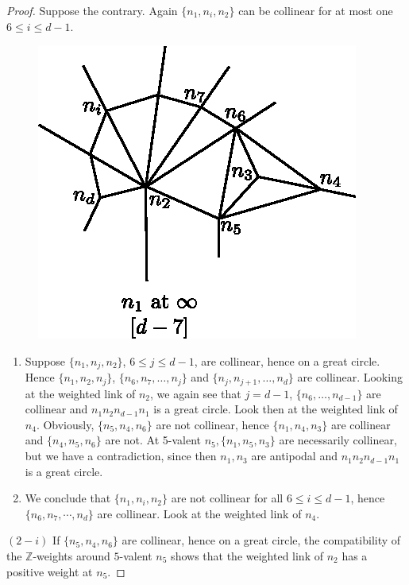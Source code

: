 \begin{proof}
Suppose the contrary. Again $\{n_1, n_i, n_2\}$ can be collinear for
at most one $6 \leq i \leq d-1$. 
\begin{figure}[H]
\centering 
\includegraphics{vol58-fig/fig58-46.eps} 
\end{figure}
\begin{enumerate}[(1)]
\item Suppose $\{n_1, n_j, n_2\}$, $6 \leq j \leq d-1$, are collinear,
  hence on a great circle. Hence $\{n_1, n_2, n_j\}$, $\{n_6, n_7,
  \ldots , n_j\}$ and 
  $\{n_j, n_{j+1}, \ldots , n_d\}$ are collinear. Looking at the
  weighted link of $n_2$, we again see that $j = d-1$, $\{n_6, \ldots ,
  n_{d-1}\}$ are collinear and $n_1 n_2 n_{d-1} n_1$ is a great
  circle. Look then at the weighted link of $n_4$. Obviously, $\{ n_5,
  n_4, n_6\}$ are not collinear, hence $\{ n_1, n_4, n_3\}$ are
  collinear and $\{n_4, n_5, n_6\}$ are not. At 5-valent $n_5, \{ n_1,
  n_5, n_3\}$ are necessarily collinear, but we have a contradiction,
  since then $n_1, n_3$ are antipodal and $n_1n_2n_{d-1}n_1$ is a
  great circle. 

\item We conclude that $\{ n_1, n_i, n_2\}$ are not collinear for all
  $6 \leq i \leq d -1$, hence $\{n_6, n_7, \cdots , n_d\}$ are
  collinear. Look at the weighted link of $n_4$. 
\end{enumerate}

\noindent
$(2-i)$ If $\{ n_5, n_4, n_6\}$ are collinear, hence on a great
circle,  the compatibility of the $\mathbb{Z}$-weights around
$5$-valent $n_5$ shows that the weighted link of $n_2$ has a positive
weight at $n_5$. 


\end{proof}
